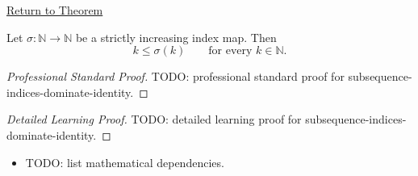 \newpage
{}
\label{prf:subsequence-indices-dominate-identity}

\begin{remark*}[Return]
\hyperref[thm:subsequence-indices-dominate-identity]{Return to Theorem}
\end{remark*}

\begin{theorem*}
Let $\sigma:\mathbb{N}\to\mathbb{N}$ be a strictly increasing index map.
Then
\[
  k\le \sigma(k)
  \qquad
  \text{for every } k\in\mathbb{N}.
\]

\smallskip
\noindent
\end{theorem*}

\begin{proof}[Professional Standard Proof]
\LRAProofBodyStart
TODO: professional standard proof for subsequence-indices-dominate-identity.
\end{proof}

\begin{proof}[Detailed Learning Proof]
\LRAProofBodyStart
TODO: detailed learning proof for subsequence-indices-dominate-identity.
\end{proof}

\begin{remark*}
\end{remark*}

\begin{dependencies}
\begin{itemize}
  \item TODO: list mathematical dependencies.
\end{itemize}
\end{dependencies}

\clearpage
